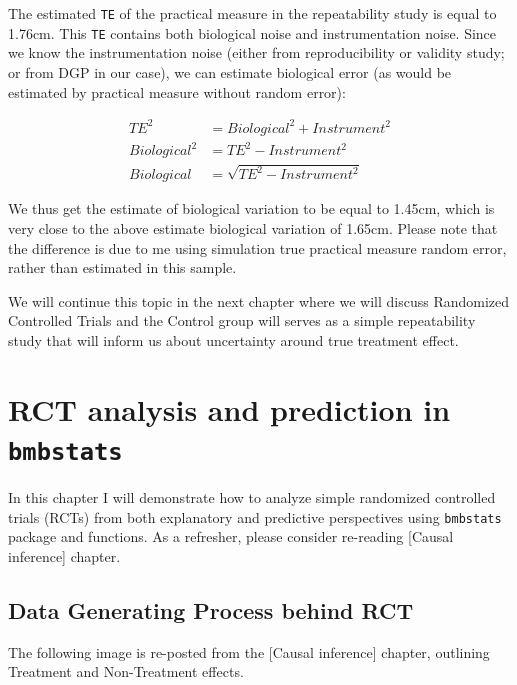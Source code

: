 \documentclass[
]{book}
\begin{document}
The estimated \texttt{TE} of the practical measure in the repeatability study is equal to 1.76cm. This \texttt{TE} contains both biological noise and instrumentation noise. Since we know the instrumentation noise (either from reproducibility or validity study; or from DGP in our case), we can estimate biological error (as would be estimated by practical measure without random error):

\begin{equation}
  \begin{split}
  TE^2 &= Biological^2 + Instrument^2 \\
  Biological^2 &= TE^2 - Instrument^2 \\
  Biological &= \sqrt{TE^2 - Instrument^2}
  \end{split}
\end{equation}

We thus get the estimate of biological variation to be equal to 1.45cm, which is very close to the above estimate biological variation of 1.65cm. Please note that the difference is due to me using simulation true practical measure random error, rather than estimated in this sample.

We will continue this topic in the next chapter where we will discuss Randomized Controlled Trials and the Control group will serves as a simple repeatability study that will inform us about uncertainty around true treatment effect.

\hypertarget{rct-analysis-and-prediction-in-bmbstats}{%
\chapter{\texorpdfstring{RCT analysis and prediction in \texttt{bmbstats}}{RCT analysis and prediction in bmbstats}}\label{rct-analysis-and-prediction-in-bmbstats}}

In this chapter I will demonstrate how to analyze simple randomized controlled trials (RCTs) from both explanatory and predictive perspectives using \texttt{bmbstats} package and functions. As a refresher, please consider re-reading {[}Causal inference{]} chapter.

\hypertarget{data-generating-process-behind-rct}{%
\section{Data Generating Process behind RCT}\label{data-generating-process-behind-rct}}

The following image is re-posted from the {[}Causal inference{]} chapter, outlining Treatment and Non-Treatment effects.
\end{document}
